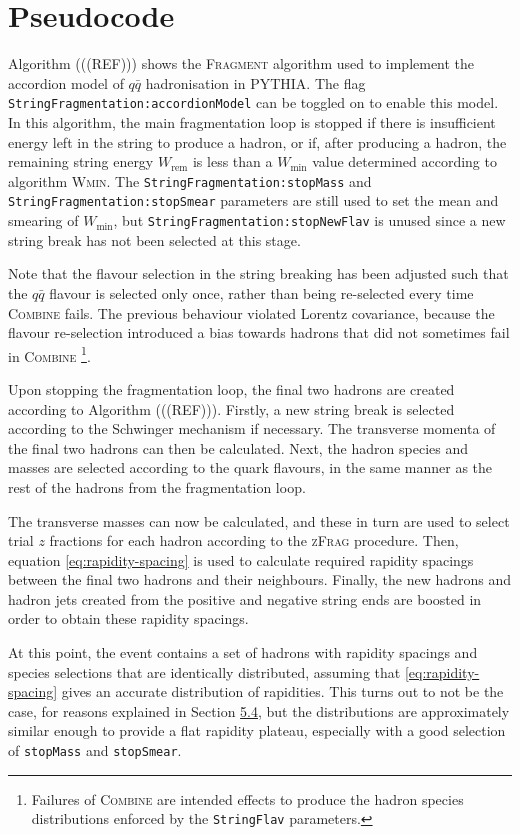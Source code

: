 \documentclass[12pt,a4paper]{report}
\begin{document}
\section{Pseudocode}
Algorithm (((REF))) shows the \textsc{Fragment} algorithm used to implement the accordion model of $q\bar{q}$ hadronisation in PYTHIA. The flag \texttt{StringFragmentation:accordionModel} can be toggled on to enable this model. In this algorithm, the main fragmentation loop is stopped if there is insufficient energy left in the string to produce a hadron, or if, after producing a hadron, the remaining string energy $W_\text{rem}$ is less than a $W_\text{min}$ value determined according to algorithm \textsc{Wmin}. The \texttt{StringFragmentation:stopMass} and \texttt{StringFragmentation:stopSmear} parameters are still used to set the mean and smearing of $W_\text{min}$, but \texttt{StringFragmentation:stopNewFlav} is unused since a new string break has not been selected at this stage.

Note that the flavour selection in the string breaking has been adjusted such that the $q\bar{q}$ flavour is selected only once, rather than being re-selected every time \textsc{Combine} fails. The previous behaviour violated Lorentz covariance, because the flavour re-selection introduced a bias towards hadrons that did not sometimes fail in \textsc{Combine} \footnote{Failures of \textsc{Combine} are intended effects to produce the hadron species distributions enforced by the \texttt{StringFlav} parameters.}.

Upon stopping the fragmentation loop, the final two hadrons are created according to Algorithm (((REF))). Firstly, a new string break is selected according to the Schwinger mechanism if necessary. The transverse momenta of the final two hadrons can then be calculated. Next, the hadron species and masses are selected according to the quark flavours, in the same manner as the rest of the hadrons from the fragmentation loop.

The transverse masses can now be calculated, and these in turn are used to select trial $z$ fractions for each hadron according to the \textsc{zFrag} procedure. Then, equation \eqref{eq:rapidity-spacing} is used to calculate required rapidity spacings between the final two hadrons and their neighbours. Finally, the new hadrons and hadron jets created from the positive and negative string ends are boosted in order to obtain these rapidity spacings.

At this point, the event contains a set of hadrons with rapidity spacings and species selections that are identically distributed, assuming that \eqref{eq:rapidity-spacing} gives an accurate distribution of rapidities. This turns out to not be the case, for reasons explained in Section \hyperref[chap:accordion-limitations]{5.4}, but the distributions are approximately similar enough to provide a flat rapidity plateau, especially with a good selection of \texttt{stopMass} and \texttt{stopSmear}.
\end{document}
